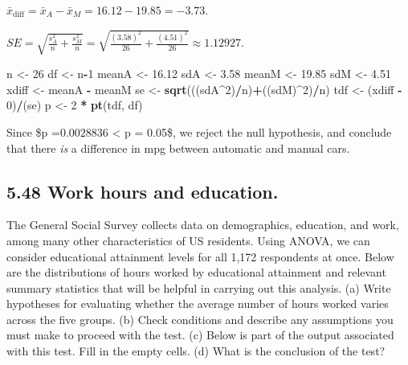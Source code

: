 \documentclass[]{article}
\newenvironment{Shaded}{\begin{snugshade}}{\end{snugshade}}
\newcommand{\KeywordTok}[1]{\textcolor[rgb]{0.13,0.29,0.53}{\textbf{#1}}}
\newcommand{\DecValTok}[1]{\textcolor[rgb]{0.00,0.00,0.81}{#1}}
\newcommand{\FloatTok}[1]{\textcolor[rgb]{0.00,0.00,0.81}{#1}}
\newcommand{\StringTok}[1]{\textcolor[rgb]{0.31,0.60,0.02}{#1}}
\newcommand{\OperatorTok}[1]{\textcolor[rgb]{0.81,0.36,0.00}{\textbf{#1}}}
\newcommand{\NormalTok}[1]{#1}
\begin{document}
\(\bar{x}_{\text{diff}} = \bar{x}_{A} - \bar{x}_{M} = 16.12 - 19.85 = -3.73\).

\(SE = \sqrt{\frac{s_{A}^2}{n}+\frac{s_{M}^2}{n}} = \sqrt{\frac{(3.58)^2}{26}+\frac{(4.51)^2}{26}} \approx 1.12927.\)

\begin{Shaded}
\begin{Highlighting}[]
\NormalTok{n <-}\StringTok{ }\DecValTok{26}
\NormalTok{df <-}\StringTok{ }\NormalTok{n}\OperatorTok{-}\DecValTok{1}
\NormalTok{meanA <-}\StringTok{ }\FloatTok{16.12}
\NormalTok{sdA <-}\StringTok{ }\FloatTok{3.58}
\NormalTok{meanM <-}\StringTok{ }\FloatTok{19.85}
\NormalTok{sdM <-}\StringTok{ }\FloatTok{4.51}
\NormalTok{xdiff <-}\StringTok{ }\NormalTok{meanA }\OperatorTok{-}\StringTok{ }\NormalTok{meanM}
\NormalTok{se <-}\StringTok{ }\KeywordTok{sqrt}\NormalTok{(((sdA}\OperatorTok{^}\DecValTok{2}\NormalTok{)}\OperatorTok{/}\NormalTok{n)}\OperatorTok{+}\NormalTok{((sdM)}\OperatorTok{^}\DecValTok{2}\NormalTok{)}\OperatorTok{/}\NormalTok{n)}
\NormalTok{tdf <-}\StringTok{ }\NormalTok{(xdiff }\OperatorTok{-}\StringTok{ }\DecValTok{0}\NormalTok{)}\OperatorTok{/}\NormalTok{(se)}
\NormalTok{p <-}\StringTok{ }\DecValTok{2} \OperatorTok{*}\StringTok{ }\KeywordTok{pt}\NormalTok{(tdf, df)}
\end{Highlighting}
\end{Shaded}

Since \$p =\(0.0028836\) \textless{} p = 0.05\$, we reject the null
hypothesis, and conclude that there \emph{is} a difference in mpg
between automatic and manual cars.

\subsection{5.48 Work hours and
education.}\label{work-hours-and-education.}

The General Social Survey collects data on demographics, education, and
work, among many other characteristics of US residents. Using ANOVA, we
can consider educational attainment levels for all 1,172 respondents at
once. Below are the distributions of hours worked by educational
attainment and relevant summary statistics that will be helpful in
carrying out this analysis. (a) Write hypotheses for evaluating whether
the average number of hours worked varies across the five groups. (b)
Check conditions and describe any assumptions you must make to proceed
with the test. (c) Below is part of the output associated with this
test. Fill in the empty cells. (d) What is the conclusion of the test?
\end{document}
